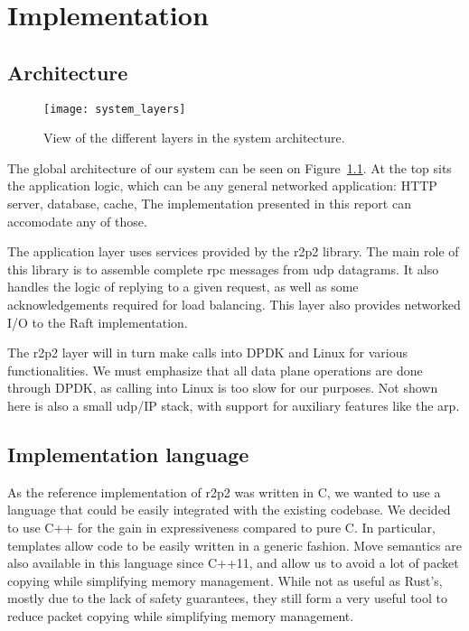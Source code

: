 \chapter{Implementation}
\label{chap:implementation}

\section{Architecture}

\begin{figure}
    \centering
    \texttt{[image: system\_layers]}
    \caption{View of the different layers in the system architecture.
    \label{fig:architecture}
    }
\end{figure}

The global architecture of our system can be seen on Figure~\ref{fig:architecture}.
At the top sits the application logic, which can be any general networked application: HTTP server, database, cache, \etc
The implementation presented in this report can accomodate any of those.

The application layer uses services provided by the \gls{r2p2} library.
The main role of this library is to assemble complete \gls{rpc} messages from \gls{udp} datagrams.
It also handles the logic of replying to a given request, as well as some acknowledgements required for load balancing.
This layer also provides networked I/O to the Raft implementation.

The \gls{r2p2} layer will in turn make calls into DPDK and Linux for various functionalities.
We must emphasize that all data plane operations are done through DPDK, as calling into Linux is too slow for our purposes.
Not shown here is also a small \gls{udp}/IP stack, with support for auxiliary features like the \gls{arp}.


\section{Implementation language}

As the reference implementation of \gls{r2p2} was written in C, we wanted to use a language that could be easily integrated with the existing codebase.
We decided to use C++ for the gain in expressiveness compared to pure C.
In particular, templates allow code to be easily written in a generic fashion.
Move semantics are also available in this language since C++11, and allow us to avoid a lot of packet copying while simplifying memory management.
While not as useful as Rust's, mostly due to the lack of safety guarantees, they still form a very useful tool to reduce packet copying while simplifying memory management.

